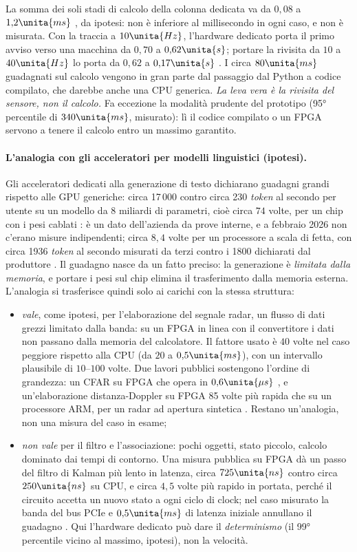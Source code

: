 La somma dei soli stadi di calcolo della colonna dedicata va da $0{,}08$ a $1{,}2\unita{ms}$ , da ipotesi: non è inferiore al millisecondo in ogni caso, e non è misurata. Con la traccia a $10\unita{Hz}$, l'hardware dedicato porta il primo avviso verso una macchina da $0{,}70$ a $0{,}62\unita{s}$; portare la rivisita da $10$ a $40\unita{Hz}$ lo porta da $0{,}62$ a $0{,}17\unita{s}$ . I circa $80\unita{ms}$ guadagnati sul calcolo vengono in gran parte dal passaggio dal Python a codice compilato, che darebbe anche una CPU generica. \emph{La leva vera è la rivisita del sensore, non il calcolo.} Fa eccezione la modalità prudente del prototipo (95° percentile di $340\unita{ms}$, misurato): lì il codice compilato o un FPGA servono a tenere il calcolo entro un massimo garantito.

\paragraph{L'analogia con gli acceleratori per modelli linguistici (ipotesi).} Gli acceleratori dedicati alla generazione di testo dichiarano guadagni grandi rispetto alle GPU generiche: circa 17\,000 contro circa 230 \emph{token} al secondo per utente su un modello da 8 miliardi di parametri, cioè circa $74$ volte, per un chip con i pesi cablati \citep{heise2026-taalas}: è un dato dell'azienda da prove interne, e a febbraio 2026 non c'erano misure indipendenti; circa $8{,}4$ volte per un processore a scala di fetta, con circa 1936 \emph{token} al secondo misurati da terzi contro i 1800 dichiarati dal produttore \citep{heise2026-taalas,cerebras2024-inference}. Il guadagno nasce da un fatto preciso: la generazione è \emph{limitata dalla memoria}, e portare i pesi sul chip elimina il trasferimento dalla memoria esterna. L'analogia si trasferisce quindi solo ai carichi con la stessa struttura:
\begin{itemize}
\item \emph{vale}, come ipotesi, per l'elaborazione del segnale radar, un flusso di dati grezzi limitato dalla banda: su un FPGA in linea con il convertitore i dati non passano dalla memoria del calcolatore. Il fattore usato è $40$ volte nel caso peggiore rispetto alla CPU (da $20$ a $0{,}5\unita{ms}$), con un intervallo plausibile di $10$--$100$ volte. Due lavori pubblici sostengono l'ordine di grandezza: un CFAR su FPGA che opera in $0{,}6\unita{\mu s}$ \citep{sim2023}, e un'elaborazione distanza-Doppler su FPGA 85 volte più rapida che su un processore ARM, per un radar ad apertura sintetica \citep{choi2021}. Restano un'analogia, non una misura del caso in esame;
\item \emph{non vale} per il filtro e l'associazione: pochi oggetti, stato piccolo, calcolo dominato dai tempi di contorno. Una misura pubblica su FPGA dà un passo del filtro di Kalman più lento in latenza, circa $725\unita{ns}$ contro circa $250\unita{ns}$ su CPU, e circa $4{,}5$ volte più rapido in portata, perché il circuito accetta un nuovo stato a ogni ciclo di clock; nel caso misurato la banda del bus PCIe e $0{,}5\unita{ms}$ di latenza iniziale annullano il guadagno \citep{summers2018}. Qui l'hardware dedicato può dare il \emph{determinismo} (il 99° percentile vicino al massimo, ipotesi), non la velocità.
\end{itemize}
